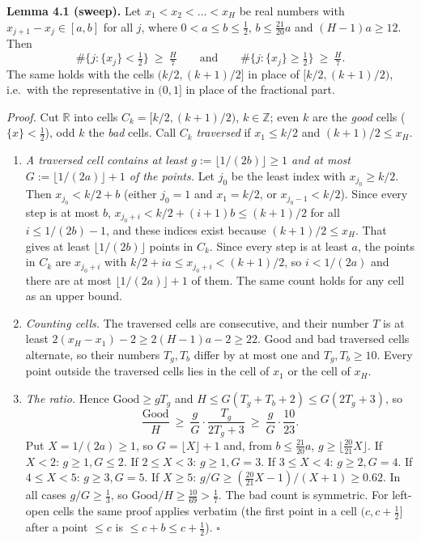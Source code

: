 \documentclass[11pt,a4paper]{article}
\begin{document}
\textbf{Lemma 4.1 (sweep).} Let \(x_1<x_2<\dots<x_H\) be real numbers
with \(x_{j+1}-x_j\in[a,b]\) for all \(j\), where
\(0<a\le b\le\tfrac12\), \(b\le\tfrac{21}{20}a\) and \((H-1)a\ge 12\).
Then \[
\#\{j:\{x_j\}<\tfrac12\}\ \ge\ \tfrac H7
\qquad\text{and}\qquad
\#\{j:\{x_j\}\ge\tfrac12\}\ \ge\ \tfrac H7 .
\] The same holds with the cells \((k/2,(k+1)/2]\) in place of
\([k/2,(k+1)/2)\), i.e.~with the representative in \((0,1]\) in place of
the fractional part.

\emph{Proof.} Cut \(\mathbb R\) into cells \(C_k=[k/2,(k+1)/2)\),
\(k\in\mathbb Z\); even \(k\) are the \emph{good} cells
(\(\{x\}<\tfrac12\)), odd \(k\) the \emph{bad} cells. Call \(C_k\)
\emph{traversed} if \(x_1\le k/2\) and \((k+1)/2\le x_H\).

\begin{enumerate}
\def\labelenumi{(\roman{enumi})}
\item
  \emph{A traversed cell contains at least
  \(g:=\lfloor 1/(2b)\rfloor\ge 1\) and at most
  \(G:=\lfloor 1/(2a)\rfloor+1\) of the points.} Let \(j_0\) be the
  least index with \(x_{j_0}\ge k/2\). Then \(x_{j_0}<k/2+b\) (either
  \(j_0=1\) and \(x_1=k/2\), or \(x_{j_0-1}<k/2\)). Since every step is
  at most \(b\), \(x_{j_0+i}<k/2+(i+1)b\le(k+1)/2\) for all
  \(i\le 1/(2b)-1\), and these indices exist because \((k+1)/2\le x_H\).
  That gives at least \(\lfloor 1/(2b)\rfloor\) points in \(C_k\). Since
  every step is at least \(a\), the points in \(C_k\) are \(x_{j_0+i}\)
  with \(k/2+ia\le x_{j_0+i}<(k+1)/2\), so \(i<1/(2a)\) and there are at
  most \(\lfloor 1/(2a)\rfloor+1\) of them. The same count holds for any
  cell as an upper bound.
\item
  \emph{Counting cells.} The traversed cells are consecutive, and their
  number \(T\) is at least \(2(x_H-x_1)-2\ge 2(H-1)a-2\ge 22\). Good and
  bad traversed cells alternate, so their numbers \(T_g,T_b\) differ by
  at most one and \(T_g,T_b\ge 10\). Every point outside the traversed
  cells lies in the cell of \(x_1\) or the cell of \(x_H\).
\item
  \emph{The ratio.} Hence \(\mathrm{Good}\ge gT_g\) and
  \(H\le G(T_g+T_b+2)\le G(2T_g+3)\), so \[
  \frac{\mathrm{Good}}H\ \ge\ \frac gG\cdot\frac{T_g}{2T_g+3}\ \ge\ \frac gG\cdot\frac{10}{23}.
  \] Put \(X=1/(2a)\ge 1\), so \(G=\lfloor X\rfloor+1\) and, from
  \(b\le\tfrac{21}{20}a\), \(g\ge\lfloor\tfrac{20}{21}X\rfloor\). If
  \(X<2\): \(g\ge 1,G\le 2\). If \(2\le X<3\): \(g\ge 1,G=3\). If
  \(3\le X<4\): \(g\ge 2,G=4\). If \(4\le X<5\): \(g\ge 3,G=5\). If
  \(X\ge 5\): \(g/G\ge(\tfrac{20}{21}X-1)/(X+1)\ge 0.62\). In all cases
  \(g/G\ge\tfrac13\), so \(\mathrm{Good}/H\ge\tfrac{10}{69}>\tfrac17\).
  The bad count is symmetric. For left-open cells the same proof applies
  verbatim (the first point in a cell \((c,c+\tfrac12]\) after a point
  \(\le c\) is \(\le c+b\le c+\tfrac12\)). \(\square\)
\end{enumerate}
\end{document}
